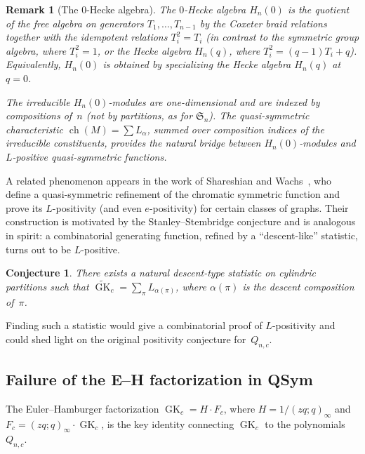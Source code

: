 \documentclass[11pt]{article}
\newtheorem{conjecture}[theorem]{Conjecture}
\newtheorem{remark}[theorem]{Remark}
\newcommand{\GK}{\operatorname{GK}}
\newcommand{\qpoch}[2]{(#1;#2)_\infty}
\begin{document}
\begin{remark}[The $0$-Hecke algebra]\label{rem:0hecke}
The \emph{$0$-Hecke algebra} $H_n(0)$ is the quotient
of the free algebra on generators $T_1, \ldots, T_{n-1}$
by the Coxeter braid relations together with the
\emph{idempotent} relations $T_i^2 = T_i$
(in contrast to the symmetric group algebra, where
$T_i^2 = 1$, or the Hecke algebra $H_n(q)$, where
$T_i^2 = (q-1)T_i + q$). Equivalently, $H_n(0)$
is obtained by specializing the Hecke algebra
$H_n(q)$ at $q = 0$.

The irreducible $H_n(0)$-modules are one-dimensional
and are indexed by compositions of~$n$ (not by
partitions, as for $\mathfrak{S}_n$). The
quasi-symmetric characteristic
$\operatorname{ch}(M) = \sum L_\alpha$, summed over
composition indices of the irreducible constituents,
provides the natural bridge between $H_n(0)$-modules
and $L$-positive quasi-symmetric functions.
\end{remark}

A related phenomenon appears in the work of Shareshian and
Wachs~\cite{shareshian-wachs}, who define a quasi-symmetric
refinement of the chromatic symmetric function and prove its
$L$-positivity (and even $e$-positivity) for certain classes
of graphs. Their construction is motivated by the
Stanley--Stembridge conjecture and is analogous in spirit:
a combinatorial generating function, refined by a
``descent-like'' statistic, turns out to be $L$-positive.

\begin{conjecture}\label{conj:descent}
There exists a natural descent-type statistic on cylindric
partitions such that $\widetilde{\GK}_c = \sum_\pi L_{\alpha(\pi)}$,
where $\alpha(\pi)$ is the descent composition of~$\pi$.
\end{conjecture}

Finding such a statistic would give a combinatorial proof of
$L$-positivity and could shed light on the original positivity
conjecture for~$Q_{n,c}$.

\subsection{Failure of the E--H factorization in QSym}

The Euler--Hamburger factorization $\GK_c = H \cdot F_c$,
where $H = 1/\qpoch{zq}{q}$ and $F_c = \qpoch{zq}{q} \cdot \GK_c$,
is the key identity connecting $\GK_c$ to the polynomials~$Q_{n,c}$.
\end{document}
